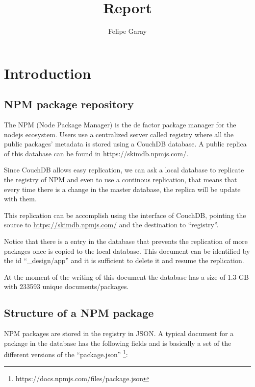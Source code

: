 \documentclass[letterpaper,12pt]{report}
\title{Report}
\author{Felipe Garay}
\begin{document}
\maketitle
\newpage
\tableofcontents
\newpage


\chapter{Introduction}




\section{NPM package repository}

The NPM (Node Package Manager) is the de factor package manager for the nodejs
ecosystem. Users use a centralized server called registry where all the public
packages' metadata is stored using a CouchDB database. A public replica of this
database can be found in \url{https://skimdb.npmjs.com/}.

Since CouchDB allows easy replication, we can ask a local database to replicate
the registry of NPM and even to use a continous replication, that means that
every time there is a change in the master database, the replica will be update
with them.

This replication can be accomplish using the interface of CouchDB, pointing the
source to \url{https://skimdb.npmjs.com/} and the destination to ``registry''.

Notice that there is a entry in the database that prevents the replication of
more packages once is copied to the local database. This document can be
identified by the id ``\_design/app'' and it is sufficient to delete it and
resume the replication.

At the moment of the writing of this document the database has a size of 1.3 GB
with 233593	unique documents/packages.

\section{Structure of a NPM package}


NPM packages are stored in the registry in JSON. A typical document for a
package in the database has the following fields and is basically a set of the
different versions of the ``package.json''
\footnote{https://docs.npmjs.com/files/package.json}:
\end{document}
